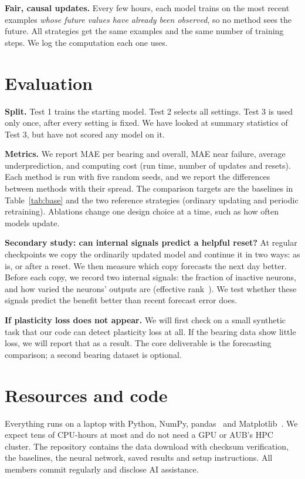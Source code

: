 \documentclass[11pt,twocolumn]{article}
\begin{document}
\textbf{Fair, causal updates.} Every few hours, each model trains on the most recent examples \emph{whose future values have already been observed}, so no method sees the future. All strategies get the same examples and the same number of training steps. We log the computation each one uses.

\section{Evaluation}
\textbf{Split.} Test 1 trains the starting model. Test 2 selects all settings. Test 3 is used only once, after every setting is fixed. We have looked at summary statistics of Test 3, but have not scored any model on it.

\textbf{Metrics.} We report MAE per bearing and overall, MAE near failure, average underprediction, and computing cost (run time, number of updates and resets). Each method is run with five random seeds, and we report the differences between methods with their spread. The comparison targets are the baselines in Table~\ref{tab:base} and the two reference strategies (ordinary updating and periodic retraining). Ablations change one design choice at a time, such as how often models update.

\textbf{Secondary study: can internal signals predict a helpful reset?} At regular checkpoints we copy the ordinarily updated model and continue it in two ways: as is, or after a reset. We then measure which copy forecasts the next day better. Before each copy, we record two internal signals: the fraction of inactive neurons, and how varied the neurons' outputs are (effective rank~\citep{roy2007}). We test whether these signals predict the benefit better than recent forecast error does.

\textbf{If plasticity loss does not appear.} We will first check on a small synthetic task that our code can detect plasticity loss at all. If the bearing data show little loss, we will report that as a result. The core deliverable is the forecasting comparison; a second bearing dataset is optional.

\section{Resources and code}
Everything runs on a laptop with Python, NumPy, pandas~\citep{pandas} and Matplotlib~\citep{matplotlib}. We expect tens of CPU-hours at most and do not need a GPU or AUB's HPC cluster. The repository contains the data download with checksum verification, the baselines, the neural network, saved results and setup instructions. All members commit regularly and disclose AI assistance.
\end{document}
